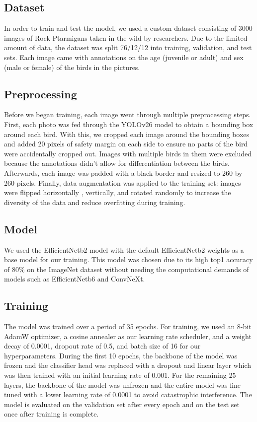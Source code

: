 \documentclass{article}
\begin{document}
\subsection{Dataset}
In order to train and test the model, we used a custom dataset consisting of 3000 images of Rock Ptarmigans taken in the wild by researchers. Due to the limited amount of data, the dataset was split 76/12/12 into training, validation, and test sets. Each image came with annotations on the age (juvenile or adult) and sex (male or female) of the birds in the pictures.

\subsection{Preprocessing}
Before we began training, each image went through multiple preprocessing steps. First, each photo was fed through the YOLOv26 \cite{sapkota2026yolo26keyarchitecturalenhancements} model to obtain a bounding box around each bird. With this, we cropped each image around the bounding boxes and added 20 pixels of safety margin on each side to ensure no parts of the bird were accidentally cropped out. Images with multiple birds in them were excluded because the annotations didn't allow for differentiation between the birds. Afterwards, each image was padded with a black border and resized to 260 by 260 pixels. Finally, data augmentation was applied to the training set: images were flipped horizontally , vertically, and rotated randomly 
to increase the diversity of the data and reduce overfitting during training.

\subsection{Model}
We used the EfficientNetb2 \cite{DBLP:journals/corr/abs-1905-11946} model with the default EfficientNetb2 weights as a base model for our training. This model was chosen due to its high top1 accuracy of 80\% on the ImageNet dataset without needing the computational demands of models such as EfficientNetb6 and ConvNeXt. 

\subsection{Training}
The model was trained over a period of 35 epochs. For training, we used an 8-bit AdamW \cite{DBLP:journals/corr/abs-1711-05101} optimizer, a cosine annealer as our learning rate scheduler, and a weight decay of 0.0001, dropout rate of 0.5, and batch size of 16 for our hyperparameters. During the first 10 epochs, the backbone of the model was frozen and the classifier head was replaced with a dropout and linear layer which was then trained with an initial learning rate of 0.001. For the remaining 25 layers, the backbone of the model was unfrozen and the entire model was fine tuned with a lower learning rate of 0.0001 to avoid catastrophic interference. The model is evaluated on the validation set after every epoch and on the test set once after training is complete. 
\end{document}
